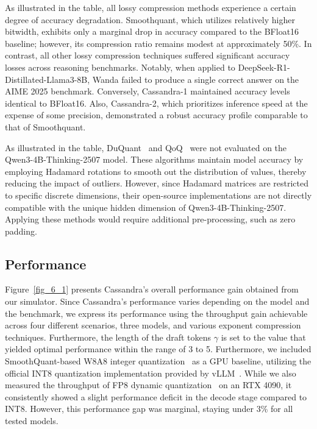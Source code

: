 As illustrated in the table, all lossy compression methods experience a certain degree of accuracy degradation. Smoothquant, which utilizes relatively higher bitwidth, exhibits only a marginal drop in accuracy compared to the BFloat16 baseline; however, its compression ratio remains modest at approximately 50\%.
In contrast, all other lossy compression techniques suffered significant accuracy losses across reasoning benchmarks. Notably, when applied to DeepSeek-R1-Distillated-Llama3-8B, Wanda failed to produce a single correct answer on the AIME 2025 benchmark.
Conversely, Cassandra-1 maintained accuracy levels identical to BFloat16. Also, Cassandra-2, which prioritizes inference speed at the expense of some precision, demonstrated a robust accuracy profile comparable to that of Smoothquant.


As illustrated in the table, DuQuant~\cite{duquant} and QoQ~\cite{qserve} were not evaluated on the Qwen3-4B-Thinking-2507 model. These algorithms maintain model accuracy by employing Hadamard rotations to smooth out the distribution of values, thereby reducing the impact of outliers. However, since Hadamard matrices are restricted to specific discrete dimensions, their open-source implementations are not directly compatible with the unique hidden dimension of Qwen3-4B-Thinking-2507. Applying these methods would require additional pre-processing, such as zero padding.

\subsection{Performance}
\label{section_6_3}
Figure~\ref{fig_6_1} presents Cassandra's overall performance gain obtained from our simulator. Since Cassandra's performance varies depending on the model and the benchmark, we express its performance using the throughput gain achievable across four different scenarios, three models, and various exponent compression techniques. Furthermore, the length of the draft tokens $\gamma$ is set to the value that yielded optimal performance within the range of 3 to 5.
Furthermore, we included SmoothQuant-based W8A8 integer quantization~\cite{Smoothquant} as a GPU baseline, utilizing the official INT8 quantization implementation provided by vLLM~\cite{W8A8-INT8-Dynamic}. While we also measured the throughput of FP8 dynamic quantization~\cite{W8A8-FP8-Dynamic} on an RTX 4090, it consistently showed a slight performance deficit in the decode stage compared to INT8. However, this performance gap was marginal, staying under 3\% for all tested models.


